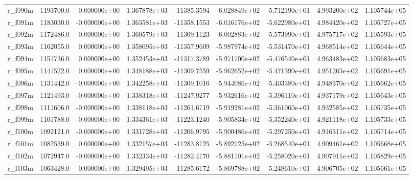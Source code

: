 \documentclass[10pt]{article}
\begin{document}
\begin{landscape}
\begin{longtable}{|l|r|r|r|r|r|r|r|r|}
r\_f090m                 &  1193700.0 &  0.000000e+00 &  1.367878e+03 & -11385.3594 & -6.028849e+02 & -5.712190e+01 &  4.993200e+02 &  1.105744e+05 \\
r\_f091m                 &  1183030.0 & -0.000000e+00 &  1.363581e+03 & -11358.1553 & -6.016176e+02 & -5.622980e+01 &  4.984420e+02 &  1.105727e+05 \\
r\_f092m                 &  1172486.0 &  0.000000e+00 &  1.360579e+03 & -11309.1123 & -6.002883e+02 & -5.573990e+01 &  4.975717e+02 &  1.105593e+05 \\
r\_f093m                 &  1162055.0 &  0.000000e+00 &  1.358095e+03 & -11357.9609 & -5.987974e+02 & -5.531470e+01 &  4.968514e+02 &  1.105644e+05 \\
r\_f094m                 &  1151736.0 &  0.000000e+00 &  1.352453e+03 & -11317.3789 & -5.971700e+02 & -5.476540e+01 &  4.963483e+02 &  1.105683e+05 \\
r\_f095m                 &  1141522.0 &  0.000000e+00 &  1.348188e+03 & -11309.7559 & -5.962652e+02 & -5.471390e+01 &  4.951203e+02 &  1.105691e+05 \\
r\_f096m                 &  1131442.0 & -0.000000e+00 &  1.342258e+03 & -11309.1016 & -5.944086e+02 & -5.403380e+01 &  4.948370e+02 &  1.105662e+05 \\
r\_f097m                 &  1121493.0 & -0.000000e+00 &  1.338318e+03 & -11247.9277 & -5.932616e+02 & -5.396110e+01 &  4.937179e+02 &  1.105643e+05 \\
r\_f098m                 &  1111606.0 & -0.000000e+00 &  1.338118e+03 & -11261.6719 & -5.919281e+02 & -5.361060e+01 &  4.932585e+02 &  1.105735e+05 \\
r\_f099m                 &  1101788.0 & -0.000000e+00 &  1.334361e+03 & -11223.1240 & -5.905834e+02 & -5.352240e+01 &  4.921118e+02 &  1.105733e+05 \\
r\_f100m                 &  1092121.0 & -0.000000e+00 &  1.331728e+03 & -11206.9795 & -5.900486e+02 & -5.297250e+01 &  4.916311e+02 &  1.105714e+05 \\
r\_f101m                 &  1082539.0 &  0.000000e+00 &  1.332157e+03 & -11283.8125 & -5.892725e+02 & -5.268540e+01 &  4.909461e+02 &  1.105668e+05 \\
r\_f102m                 &  1072947.0 & -0.000000e+00 &  1.332334e+03 & -11282.4170 & -5.881101e+02 & -5.258020e+01 &  4.907911e+02 &  1.105829e+05 \\
r\_f103m                 &  1063428.0 &  0.000000e+00 &  1.329495e+03 & -11285.6172 & -5.869788e+02 & -5.248610e+01 &  4.906705e+02 &  1.105661e+05 \\

\end{longtable}
\end{landscape}
\end{document}

